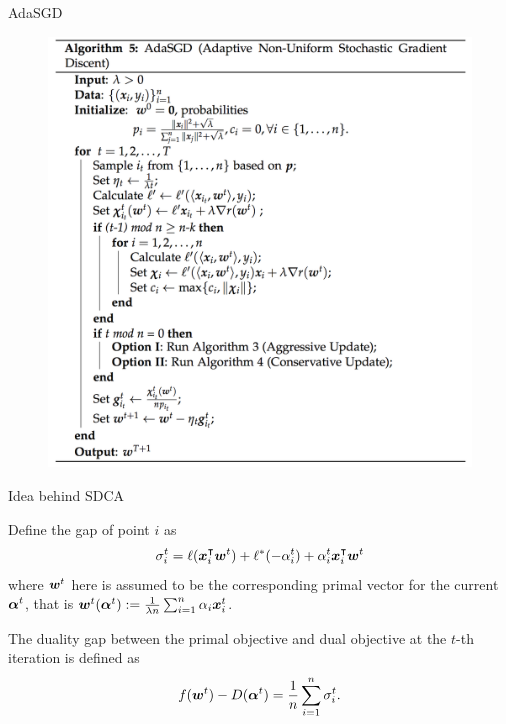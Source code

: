 \begin{frame}{AdaSGD}
\begin{figure}[H]
        \includegraphics[height=0.8\textheight]{images/AdaSGD.png} 
    \label{fig:AdaSGD}
\end{figure}
\end{frame}

\begin{frame}{Idea behind SDCA}
\begin{definition}
Define the gap of point $i$ as 
\[
\sigma_i^t =  \ell(\bm{x}_i^\intercal\bm{w}^{t})+\ell^*(-\alpha_i^{t})+\alpha_i^{t}\bm{x}_i^\intercal\bm{w}^{t} 
\]
where $\bm{w}^t$ here is assumed to be the corresponding primal vector for the current $\bm{\alpha}^t$, that is $\bm{w}^t(\bm{\alpha}^t) := \frac{1}{\lambda n}\sum_{i=1}^n \alpha_i \bm{x}_i^t$.
\end{definition}

The duality gap between the primal objective and dual objective at the $t$-th iteration is defined as
\[
    f(\bm{w}^{t})-D(\bm{\alpha}^{t}) = \frac{1}{n} \sum_{i=1}^n \sigma_i^t.
\]
\end{frame}

